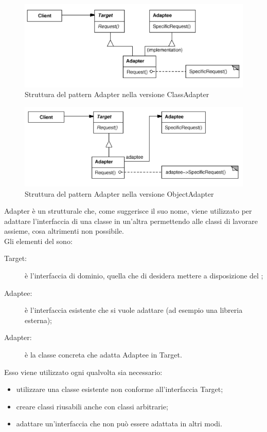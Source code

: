  \label{app:adapter}
	\begin{figure}[H]\centering
    \includegraphics[scale=0.7]{SpecificaTecnica/Pics/ClassAdapter}
    \caption{Struttura del pattern Adapter nella versione ClassAdapter}
	\end{figure}
	\begin{figure}[H]\centering
    \includegraphics[scale=0.7]{SpecificaTecnica/Pics/ObjectAdapter}
    \caption{Struttura del pattern Adapter nella versione ObjectAdapter}
	\end{figure}
Adapter è un  strutturale che, come suggerisce il suo nome, viene utilizzato per adattare l'interfaccia di una classe in un'altra permettendo alle classi di lavorare assieme, cosa altrimenti non possibile.\\
Gli elementi del  sono:
\begin{description}
\item[Target:] è l'interfaccia di dominio, quella che di desidera mettere a disposizione del ;
\item[Adaptee:] è l'interfaccia esistente che si vuole adattare (ad esempio una libreria esterna);
\item[Adapter:] è la classe concreta che adatta Adaptee in Target.
\end{description}

Esso viene utilizzato ogni qualvolta sia necessario:
\begin{itemize}
\item utilizzare una classe esistente non conforme all'interfaccia Target;
\item creare classi riusabili anche con classi arbitrarie;
\item adattare un'interfaccia che non può essere adattata in altri modi.
\end{itemize}

